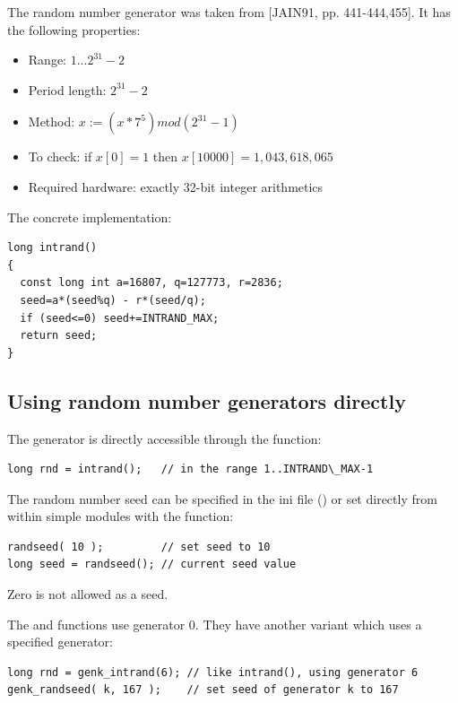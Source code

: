 The random number generator was taken from [JAIN91, pp. 441-444,455]. 
It has the following properties:
\begin{itemize}
\item{Range: $1... 2^{31}-2$}
\item{Period length: $2^{31}-2$}
\item{Method: $x := (x * 7^{5}) mod (2^{31}-1)$}
\item{To check: if $x[0]=1$ then $x[10000]=1,043,618,065$}
\item{Required hardware: exactly 32-bit integer arithmetics}
\end{itemize}

The concrete implementation:

\begin{Verbatim}
long intrand()
{
  const long int a=16807, q=127773, r=2836;
  seed=a*(seed%q) - r*(seed/q);
  if (seed<=0) seed+=INTRAND_MAX;
  return seed;
}
\end{Verbatim}



\subsection{Using random number generators directly}

The generator is directly accessible through the  function:

\begin{Verbatim}
long rnd = intrand();   // in the range 1..INTRAND\_MAX-1
\end{Verbatim}

The random number seed can be specified in the ini file
() or set directly from within
simple modules with the 
function:

\begin{Verbatim}
randseed( 10 );         // set seed to 10
long seed = randseed(); // current seed value
\end{Verbatim}


Zero is not allowed as a seed.


The  and  functions use generator 0. They have 
another variant which uses a specified generator:

\begin{Verbatim}
long rnd = genk_intrand(6); // like intrand(), using generator 6
genk_randseed( k, 167 );    // set seed of generator k to 167
\end{Verbatim}


